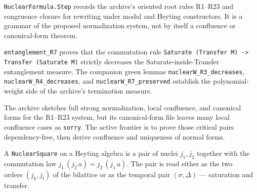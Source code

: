 \begin{proposition}\label{thm:nuclear-formula-step}\leanok{}
\texttt{NuclearFormula.Step} records the archive's oriented root rules R1--R23
and congruence closure for rewriting under modal and Heyting constructors. It
is a grammar of the proposed normalization system, not by itself a confluence
or canonical-form theorem.
\end{proposition}
\begin{theorem}\label{thm:nuclear-formula-measures}\leanok{}
\texttt{entanglement\_R7} proves that the commutation rule
\texttt{Saturate (Transfer M) -> Transfer (Saturate M)} strictly decreases the
Saturate-inside-Transfer entanglement measure. The companion green lemmas
\texttt{nuclearW\_R3\_decreases}, \texttt{nuclearW\_R4\_decreases}, and
\texttt{nuclearW\_R7\_preserved} establish the polynomial-weight side of the
archive's termination measure.
\end{theorem}
\begin{theorem}\label{thm:nuclear-formula-canonical-frontier}\notready{}
The archive sketches full strong normalization, local confluence, and canonical
forms for the R1--R23 system, but its canonical-form file leaves many local
confluence cases as \texttt{sorry}. The active frontier is to prove those
critical pairs dependency-free, then derive confluence and uniqueness of normal
forms.
\end{theorem}
\begin{proposition}\label{thm:nuclear-square}\leanok{}
A \texttt{NuclearSquare} on a Heyting algebra is a pair of nuclei $j_1, j_2$ together with the commutation law $j_1\,(j_2\,a) = j_2\,(j_1\,a)$. The pair is read either as the two orders $(j_k, j_t)$ of the bilattice or as the temporal pair $(\sigma, \Delta)$ --- saturation and transfer.
\end{proposition}
